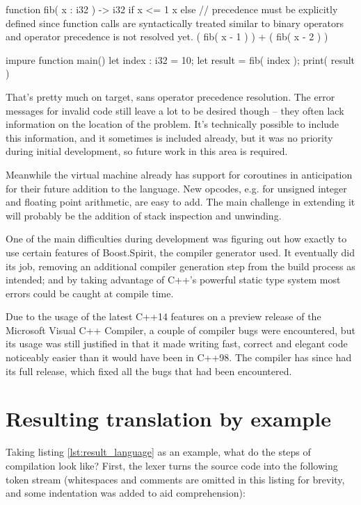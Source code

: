 \begin{perseuslisting}[caption={Actual resulting language example},label={lst:result_language}]
function fib( x : i32 ) -> i32
    if x <= 1
        x
    else
    	// precedence must be explicitly defined since function calls are syntactically treated similar to binary operators and operator precedence is not resolved yet.
        ( fib( x - 1 ) ) + ( fib( x - 2 ) )

impure function main()
{
	let index : i32 = 10;
	let result = fib( index );
	print( result )
}
\end{perseuslisting}

That's pretty much on target, sans operator precedence resolution. The error messages for invalid code still leave a lot to be desired though -- they often lack information on the location of the problem. It's technically possible to include this information, and it sometimes is included already, but it was no priority during initial development, so future work in this area is required.

Meanwhile the virtual machine already has support for coroutines in anticipation for their future addition to the language. New opcodes, e.g. for unsigned integer and floating point arithmetic, are easy to add. The main challenge in extending it will probably be the addition of stack inspection and unwinding.

One of the main difficulties during development was figuring out how exactly to use certain features of Boost.Spirit, the compiler generator used. It eventually did its job, removing an additional compiler generation step from the build process as intended; and by taking advantage of C++'s powerful static type system most errors could be caught at compile time.

Due to the usage of the latest C++14 features on a preview release of the Microsoft Visual C++ Compiler, a couple of compiler bugs were encountered, but its usage was still justified in that it made writing fast, correct and elegant code noticeably easier than it would have been in C++98. The compiler has since had its full release, which fixed all the bugs that had been encountered.


\section{Resulting translation by example}

Taking listing \ref{lst:result_language} as an example, what do the steps of compilation look like? First, the lexer turns the source code into the following token stream (whitespaces and comments are omitted in this listing for brevity, and some indentation was added to aid comprehension):


